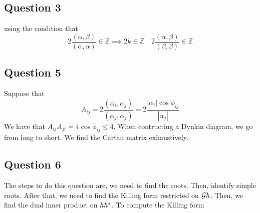 \subsection{Question 3} 
using the condition that 
\[
	2 \frac{\left( \alpha, \beta  \right)  }{ \left( \alpha, \alpha  \right)  } \in \mathbb{ Z}  \implies 2k \in \mathbb{ Z} \quad 2 \frac{  \left( \alpha, \beta   \right)   }{\left( \beta , \beta  \right)  } \in \mathbb{ Z} 
\] 

\subsection{Question 5} 
Suppose that 
\[
	A _{ ij }  = 2 \frac{ \left( \alpha _ i, \alpha _ j   \right)  }{ \left( \alpha _ j , \alpha _ j  \right)  }
	 = 2 \frac{| \alpha _ i | \cos \phi _{ ij } }{ | \alpha _ j | } 
\] We have that $ A_{ ij } A_{ ji }  =  4 \cos \phi _{ ij } \leq 4 $. 
When contructing a Dynkin diagram, we go from long to short. 
We find the Cartan matrix exhaustively. 

\subsection{Question 6} 
The steps to do this question are, 
we need to find the roots. Then, identify simple roots. 
After that, we need to find the Killing form 
restricted on $ \mathcal{ G } h $. Then, we find 
the dual inner product on $ h h ^ * $. 
To compute the Killing form 

